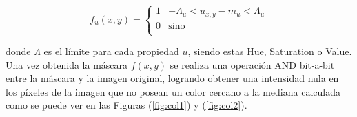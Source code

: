\begin{equation}
f_{u}(x,y) = \left\{
\begin{array}{ll}


      1 & -\Lambda_u < u_{x, y} - m_u < \Lambda_u \\
      
      
      
      0 & \text{sino} \\
      
      
\end{array} 
\right.
\end{equation}

donde $\Lambda$ es el límite para cada propiedad $u$, siendo estas Hue, Saturation o Value. Una vez obtenida la máscara $f(x, y)$ se realiza una operación AND bit-a-bit entre la máscara y la imagen original, logrando obtener una intensidad nula en los píxeles de la imagen que no posean un color cercano a la mediana calculada como se puede ver en las Figuras (\ref{fig:col1}) y (\ref{fig:col2}).

